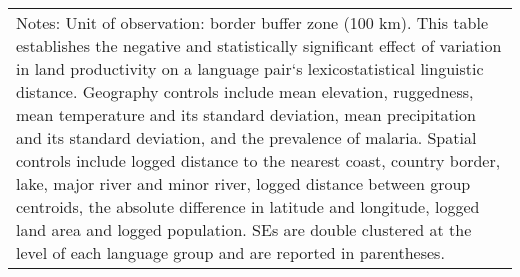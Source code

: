 \begin{tabular}{lccccccc}
    \bottomrule
\multicolumn{8}{p{\textwidth}}{\scriptsize Notes: Unit of observation: border buffer zone (100 km). This table establishes the negative and statistically significant effect of variation in land productivity on a language pair`s lexicostatistical linguistic distance. Geography controls include mean elevation, ruggedness, mean temperature and its standard deviation, mean precipitation and its standard deviation, and the prevalence of malaria. Spatial controls include logged distance to the nearest coast, country border, lake, major river and minor river, logged distance between group centroids, the absolute difference in latitude and longitude, logged land area and logged population. SEs are double clustered at the level of each language group and are reported in parentheses.}
\end{tabular}
